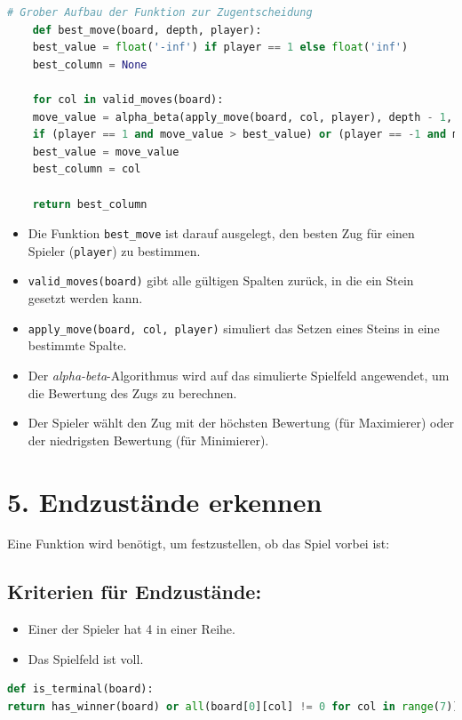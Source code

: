 \begin{lstlisting}[language=Python, caption=Entscheidung für den besten Zug - Überblick]
	# Grober Aufbau der Funktion zur Zugentscheidung
	def best_move(board, depth, player):
	best_value = float('-inf') if player == 1 else float('inf')
	best_column = None
	
	for col in valid_moves(board):
	move_value = alpha_beta(apply_move(board, col, player), depth - 1, -float('inf'), float('inf'), False)
	if (player == 1 and move_value > best_value) or (player == -1 and move_value < best_value):
	best_value = move_value
	best_column = col
	
	return best_column
\end{lstlisting}
\begin{itemize}

	\item Die Funktion \texttt{best\_move} ist darauf ausgelegt, den besten Zug für einen Spieler (\texttt{player}) zu bestimmen. 
	\item \texttt{valid\_moves(board)} gibt alle gültigen Spalten zurück, in die ein Stein gesetzt werden kann. 
	\item \texttt{apply\_move(board, col, player)} simuliert das Setzen eines Steins in eine bestimmte Spalte. 
	\item Der \emph{alpha-beta}-Algorithmus wird auf das simulierte Spielfeld angewendet, um die Bewertung des Zugs zu berechnen. 
	\item Der Spieler wählt den Zug mit der höchsten Bewertung (für Maximierer) oder der niedrigsten Bewertung (für Minimierer).
\end{itemize}

\section*{5. Endzustände erkennen}

Eine Funktion wird benötigt, um festzustellen, ob das Spiel vorbei ist:

\subsection*{Kriterien für Endzustände:}
\begin{itemize}
	\item Einer der Spieler hat 4 in einer Reihe.
	\item Das Spielfeld ist voll.
\end{itemize}

\begin{lstlisting}[language=Python, caption=Erkennung des Endzustands]
def is_terminal(board):
return has_winner(board) or all(board[0][col] != 0 for col in range(7))
\end{lstlisting}

